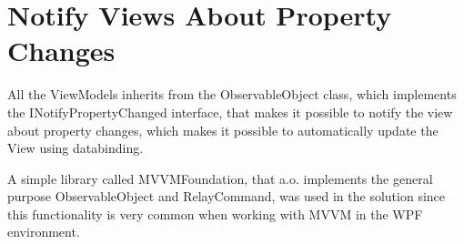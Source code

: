 \section{Notify Views About Property Changes}
All the ViewModels inherits from the ObservableObject class, which implements the INotifyPropertyChanged interface, that makes it possible to notify the view about property changes, which makes it possible to automatically update the View using databinding.

A simple library called MVVMFoundation\cite{mvvmF}, that a.o. implements the general purpose ObservableObject and RelayCommand, was used in the solution since this functionality is very common when working with MVVM in the WPF environment.
